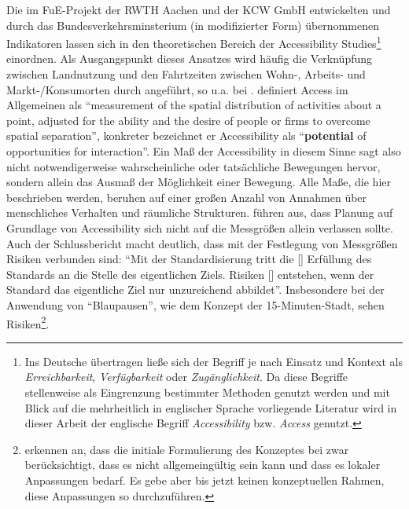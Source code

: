 \documentclass[11pt,pdftex,a4paper]{scrartcl}
\begin{document}
	Die im FuE-Projekt der RWTH Aachen und der KCW GmbH entwickelten und durch das Bundesverkehrsminsterium (in modifizierter Form) übernommenen Indikatoren lassen sich in den theoretischen Bereich der Accessibility Studies\footnote{Ins Deutsche übertragen ließe sich der Begriff je nach Einsatz und Kontext als \textit{Erreichbarkeit}, \textit{Verfügbarkeit} oder \textit{Zugänglichkeit}. Da diese Begriffe stellenweise als Eingrenzung bestimmter Methoden genutzt werden und mit Blick auf die mehrheitlich in englischer Sprache vorliegende Literatur wird in dieser Arbeit der englische Begriff \textit{Accessibility} bzw. \textit{Access} genutzt.} einordnen. Als Ausgangspunkt dieses Ansatzes wird häufig die Verknüpfung zwischen Landnutzung und den Fahrtzeiten zwischen Wohn-, Arbeits- und Markt-/Konsumorten durch \textcite{hansenHowAccessibilityShapes1959} angeführt, so u.a. bei \textcites[145]{koenigIndicatorsUrbanAccessibility1980}[194]{kwanSpaceTimeIntegralMeasures1998}[18]{harrisAccessibilityConceptsApplications2001}[46]{levinsonTransportAccessManual2020}. \textcite[73, Hervorhebung im Original]{hansenHowAccessibilityShapes1959} definiert Access im Allgemeinen als \enquote{measurement of the spatial distribution of activities about a point, adjusted for the ability and the desire of people or firms to overcome spatial separation}, konkreter bezeichnet er Accessibility als \enquote{\textbf{potential} of opportunities for interaction}. Ein Maß der Accessibility in diesem Sinne sagt also nicht notwendigerweise wahrscheinliche oder tatsächliche Bewegungen hervor, sondern allein das Ausmaß der Möglichkeit einer Bewegung. Alle Maße, die hier beschrieben werden, beruhen auf einer großen Anzahl von Annahmen über menschliches Verhalten und räumliche Strukturen. \textcite{potPrinciplesPlacebasedAccessibility2026} führen aus, dass Planung auf Grundlage von Accessibility sich nicht auf die Messgrößen allein verlassen sollte. Auch der Schlussbericht macht deutlich, dass mit der Festlegung von Messgrößen Risiken verbunden sind: \enquote{Mit der Standardisierung tritt die [\textellipsis] Erfüllung des Standards an die Stelle des eigentlichen Ziels. Risiken [\textellipsis] entstehen, wenn der Standard das eigentliche Ziel nur unzureichend abbildet}\parencite[32]{kcwgmbhMethodikUndEmpfehlungen2024}. Insbesondere bei der Anwendung von \enquote{Blaupausen}, wie dem Konzept der 15-Minuten-Stadt, sehen \textcite[3]{potPrinciplesPlacebasedAccessibility2026} Risiken\footnote{\textcite[1, 8]{potPrinciplesPlacebasedAccessibility2026} erkennen an, dass die initiale Formulierung des Konzeptes bei \textcite{morenoIntroducing15MinuteCity2021} zwar berücksichtigt, dass es nicht allgemeingültig sein kann und dass es lokaler Anpassungen bedarf. Es gebe aber bis jetzt keinen konzeptuellen Rahmen, diese Anpassungen so durchzuführen.}.
	
\end{document}
